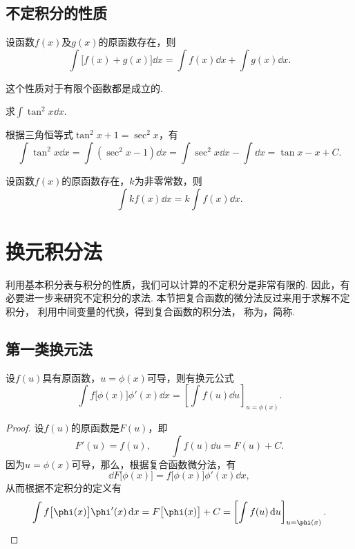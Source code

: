 \subsection{不定积分的性质}
\begin{property}
设函数\(f(x)\)及\(g(x)\)的原函数存在，则\[
\int \bigl[f(x) + g(x)\bigr] \dd{x} = \int f(x) \dd{x} + \int g(x) \dd{x}.
\]
\end{property}
这个性质对于有限个函数都是成立的.

\begin{example}
求\(\int \tan^2 x \dd{x}\).
\begin{solution}
根据三角恒等式\(\tan^2 x + 1 = \sec^2 x\)，有\[
\int \tan^2 x \dd{x}
= \int (\sec^2 x - 1) \dd{x}
= \int \sec^2 x \dd{x} - \int \dd{x}
= \tan x - x + C.
\]
\end{solution}
\end{example}

\begin{property}
设函数\(f(x)\)的原函数存在，\(k\)为非零常数，则\[
\int k f(x) \dd{x} = k \int f(x) \dd{x}.
\]
\end{property}

\section{换元积分法}
利用基本积分表与积分的性质，我们可以计算的不定积分是非常有限的.
因此，有必要进一步来研究不定积分的求法.
本节把复合函数的微分法反过来用于求解不定积分，
利用中间变量的代换，得到复合函数的积分法，
称为，简称.

\subsection{第一类换元法}
\begin{theorem}
设\(f(u)\)具有原函数，\(u=\phi(x)\)可导，则有换元公式\[
\int f\bigl[\phi(x)\bigr] \phi'(x) \dd{x} = \left[ \int f(u) \dd{u} \right]_{u=\phi(x)}.
\]
\begin{proof}
设\(f(u)\)的原函数是\(F(u)\)，即\[
F'(u) = f(u),
\qquad
\int f(u) \dd{u} = F(u) + C.
\]因为\(u = \phi(x)\)可导，那么，根据复合函数微分法，有\[
\dd{F\bigl[\phi(x)\bigr]} = f\bigl[\phi(x)\bigr] \phi'(x) \dd{x},
\]从而根据不定积分的定义有\[
\int f\bigl[\phi(x)\bigr] \phi'(x) \dd{x}
= F\bigl[\phi(x)\bigr] + C
= \left[ \int f(u) \dd{u} \right]_{u=\phi(x)}.
\qedhere
\]
\end{proof}
\end{theorem}

